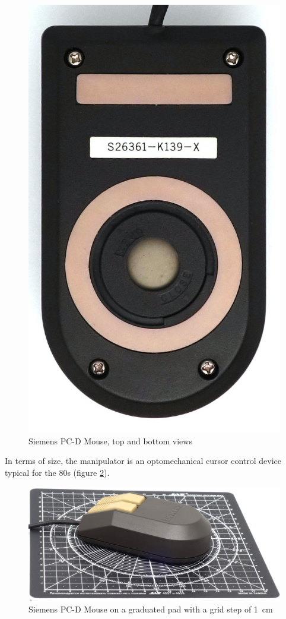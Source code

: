 \documentclass[11pt, a4paper]{article}
\begin{document}
\begin{figure}[h]
    \includegraphics[scale=0.5]{1985_siemens_pcd_mouse/bottom_30.jpg}
    \caption{Siemens PC-D Mouse, top and bottom views}
    \label{fig:SiemensPCDTopBottom}
\end{figure}

In terms of size, the manipulator is an optomechanical cursor control device typical for the 80s (figure \ref{fig:SiemensPCDSize}).

\begin{figure}[h]
    \centering
    \includegraphics[scale=0.45]{1985_siemens_pcd_mouse/size_30.jpg}
    \caption{Siemens PC-D Mouse on a graduated pad with a grid step of 1~cm}
    \label{fig:SiemensPCDSize}
\end{figure}
\end{document}
